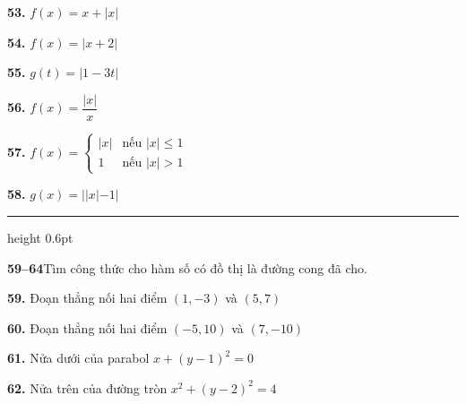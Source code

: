\documentclass[10pt,letterpaper]{article}
\begin{document}
\begin{minipage}[t]{0.485\textwidth}
    \vspace{0.33em}
    \noindent
    \begin{minipage}[t]{0.48\textwidth}
        \textbf{53.} $f(x) = x + |x|$
    \end{minipage}%
    \hfill
    \begin{minipage}[t]{0.48\textwidth}
        \textbf{54.} $f(x) = |x + 2|$
    \end{minipage}

    \vspace{0.49em}
    \noindent
    \begin{minipage}[t]{0.48\textwidth}
        \textbf{55.} $g(t) = |1 - 3t|$
    \end{minipage}%
    \hfill
    \begin{minipage}[t]{0.48\textwidth}
        \textbf{56.} $f(x) = \dfrac{|x|}{x}$
    \end{minipage}

    \vspace{0.49em}
    \noindent
    \begin{minipage}[t]{0.48\textwidth}
        \textbf{57.} $f(x) = \begin{cases}
            |x| & \text{nếu } |x| \le 1 \\
            1 & \text{nếu } |x| > 1
        \end{cases}$
    \end{minipage}%
    \hfill
    \begin{minipage}[t]{0.48\textwidth}
        \textbf{58.} $g(x) = ||x| - 1|$
    \end{minipage}

    \vspace{0.66em}
    {\color{stewartcyan}\hrule height 0.6pt}
    \vspace{0.49em}

    \noindent
    \textbf{\textsf{\color{stewartcyan}59--64}}\quad Tìm công thức cho hàm số có đồ thị là đường cong đã cho.

    \vspace{0.33em}
    \textbf{59.} Đoạn thẳng nối hai điểm $(1, -3)$ và $(5, 7)$

    \vspace{0.25em}
    \textbf{60.} Đoạn thẳng nối hai điểm $(-5, 10)$ và $(7, -10)$

    \vspace{0.25em}
    \textbf{61.} Nửa dưới của parabol $x + (y - 1)^2 = 0$

    \vspace{0.25em}
    \textbf{62.} Nửa trên của đường tròn $x^2 + (y - 2)^2 = 4$

\end{minipage}%
\end{document}
